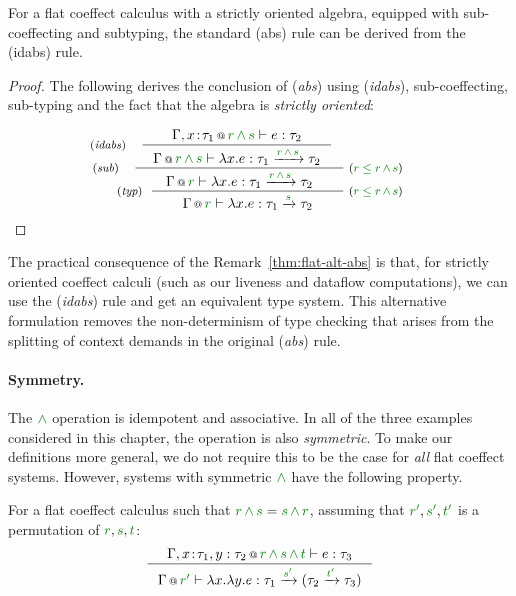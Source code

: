 \begin{remark}
\label{thm:flat-alt-abs}
For a flat coeffect calculus with a strictly oriented algebra, equipped with sub-coeffecting and
subtyping, the standard (abs) rule can be derived from the (idabs) rule.
\end{remark}
\begin{proof}
The following derives the conclusion of (\emph{abs}) using (\emph{idabs}), sub-coeffecting,
sub-typing and the fact that the algebra is \emph{strictly oriented}:

\begin{equation*}
\tyrule{typ}
  {\hspace{-5em} \tyrule{sub}
     {\hspace{-4em} \tyrule{idabs}
        {\coctx{\Gamma, x\!:\!\tau_1}{\cclrd{r} \,\czip\, \cclrd{s}} \vdash e : \tau_2}
        {\coctx{\Gamma}{\cclrd{r} \,\czip\, \cclrd{s}} \vdash \lambda x.e : \tau_1 \xrightarrow{\cclrd{r} \,\czip\, \cclrd{s}} \tau_2 } }
     {\coctx{\Gamma}{\cclrd{r}} \vdash \lambda x.e : \tau_1 \xrightarrow{\cclrd{r} \,\czip\, \cclrd{s}} \tau_2} \;
           \textnormal{\footnotesize{($\cclrd{r} \;\cleq\; \cclrd{r} \,\czip\, \cclrd{s}$)}} \hspace{-5em} }
  {\coctx{\Gamma}{\cclrd{r}} \vdash \lambda x.e : \tau_1 \xrightarrow{\cclrd{s}} \tau_2} \;
           \textnormal{\footnotesize{($\cclrd{r} \;\cleq\; \cclrd{r} \,\czip\, \cclrd{s}$)}}
\end{equation*}
\end{proof}

\noindent
The practical consequence of the Remark~\ref{thm:flat-alt-abs} is that, for strictly
oriented coeffect calculi (such as our liveness and dataflow computations), we can use
the (\emph{idabs}) rule and get an equivalent type system. This alternative formulation
removes the non-determinism of type checking that arises from the splitting of context
demands in the original (\emph{abs}) rule.

\paragraph{Symmetry.}
The $\czip$ operation is idempotent and associative. In all of the three examples considered in
this chapter, the operation is also \emph{symmetric}. To make our definitions more general, we
do not require this to be the case for \emph{all} flat coeffect systems. However, systems with
symmetric $\czip$ have the following property.

\begin{remark}
For a flat coeffect calculus such that $\cclrd{r}\,\czip\,\cclrd{s} = \cclrd{s}\,\czip\,\cclrd{r}$,
assuming that $\cclrd{r'}, \cclrd{s'}, \cclrd{t'}$ is a permutation of $\cclrd{r},\cclrd{s},\cclrd{t}$:
%
\begin{equation*}
\inference
  {\coctx{\Gamma, x\!:\!\tau_1, y:\tau_2}{\cclrd{r} \,\czip\, \cclrd{s} \,\czip\, \cclrd{t}} \vdash e : \tau_3}
  {\coctx{\Gamma}{\cclrd{r'}} \vdash \lambda x.\lambda y.e :
      \tau_1 \xrightarrow{\cclrd{s'}} (\tau_2 \xrightarrow{\cclrd{t'}} \tau_3) }
\end{equation*}
\end{remark}


